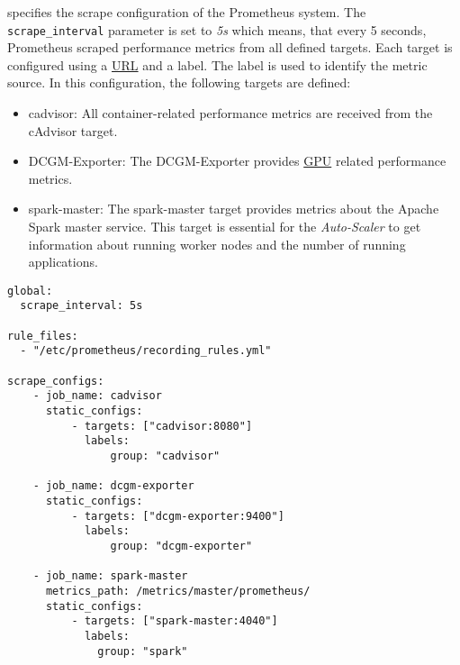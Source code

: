  specifies the scrape configuration of the Prometheus system.
The \texttt{scrape\_interval} parameter is set to \textit{5s} which means, that every 5 seconds, Prometheus scraped performance metrics from all defined targets.
Each target is configured using a \hyperlink{abbr:url}{URL} and a label. The label is used to identify the metric source.
In this configuration, the following targets are defined:
\begin{itemize}
\item cadvisor: All container-related performance metrics are received from the cAdvisor target.

\item DCGM-Exporter: The DCGM-Exporter provides \hyperlink{abbr:gpu}{GPU} related performance metrics.

\item spark-master: The spark-master target provides metrics about the Apache Spark master service. This target is essential for the \textit{Auto-Scaler} to get information about running worker nodes and the number of running applications.
\end{itemize}
\newpage
\begin{lstlisting}[label=lst:06_computing_am_prom-config, caption=Prometheus target configuration in YAML syntax]
global:
  scrape_interval: 5s
 
rule_files:
  - "/etc/prometheus/recording_rules.yml"
 
scrape_configs:
    - job_name: cadvisor
      static_configs:
          - targets: ["cadvisor:8080"]
            labels:
                group: "cadvisor"
 
    - job_name: dcgm-exporter
      static_configs:
          - targets: ["dcgm-exporter:9400"]
            labels:
                group: "dcgm-exporter"
    
    - job_name: spark-master
      metrics_path: /metrics/master/prometheus/
      static_configs:
          - targets: ["spark-master:4040"]
            labels:
              group: "spark"
\end{lstlisting}



